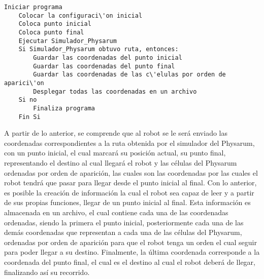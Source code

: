     \begin{lstlisting}[language={PseudoCode}, caption={Pseudo C\'odigo de las rutas}, label={Script02}]
    Iniciar programa
    Colocar la configuraci\'on inicial
    Coloca punto inicial
    Coloca punto final
    Ejecutar Simulador_Physarum
    Si Simulador_Physarum obtuvo ruta, entonces:
        Guardar las coordenadas del punto inicial
        Guardar las coordenadas del punto final
        Guardar las coordenadas de las c\'elulas por orden de aparici\'on
        Desplegar todas las coordenadas en un archivo
    Si no
        Finaliza programa
    Fin Si
    \end{lstlisting}
    \vskip 0.5cm
    A partir de lo anterior, se comprende que al robot se le ser\'a
        enviado las coordenadas correspondientes a la ruta obtenida
        por el simulador del Physarum, con un punto inicial, el cual
        marcar\'a su posici\'on actual, su punto final, representando el
        destino al cual llegar\'a el robot y las c\'elulas del Physarum
        ordenadas por orden de aparici\'on, las cuales son las
        coordenadas por las cuales el robot tendr\'a que pasar para
        llegar desde el punto inicial al final.
    \vskip 0.5cm
    Con lo anterior, es posible la creaci\'on de informaci\'on la cual
        el robot sea capaz de leer y a partir de sus propias funciones,
        llegar de un punto inicial al final. Esta informaci\'on es
        almacenada en un archivo, el cual contiene cada una de las
        coordenadas ordenadas, siendo la primera el punto inicial,
        posteriormente cada una de las dem\'as coordenadas que
        representan a cada una de las c\'elulas del Physarum,
        ordenadas por orden de aparici\'on para que el robot tenga un
        orden el cual seguir para poder llegar a su destino.
    \vskip 0.5cm
    Finalmente, la \'ultima coordenada corresponde a la
        coordenada del punto final, el cual es el destino al cual el
        robot deber\'a de llegar, finalizando as\'i su recorrido.
        
